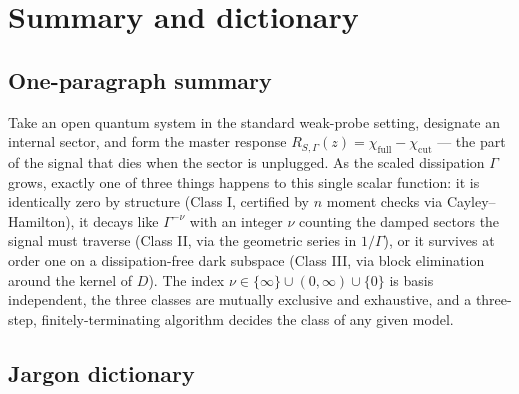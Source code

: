 \documentclass[11pt]{article}
\begin{document}
\section{Summary and dictionary}

\subsection{One-paragraph summary}

Take an open quantum system in the standard weak-probe setting, designate an
internal sector, and form the master response
$R_{S,\Gamma}(z)=\chi_{\mathrm{full}}-\chi_{\mathrm{cut}}$ --- the part of
the signal that dies when the sector is unplugged.  As the scaled dissipation
$\Gamma$ grows, exactly one of three things happens to this single scalar
function: it is identically zero by structure (Class I, certified by $n$
moment checks via Cayley--Hamilton), it decays like $\Gamma^{-\nu}$ with an
integer $\nu$ counting the damped sectors the signal must traverse
(Class II, via the geometric series in $1/\Gamma$), or it survives at order
one on a dissipation-free dark subspace (Class III, via block elimination
around the kernel of $D$).  The index $\nu\in\{\infty\}\cup(0,\infty)\cup\{0\}$
is basis independent, the three classes are mutually exclusive and
exhaustive, and a three-step, finitely-terminating algorithm decides the
class of any given model.

\subsection{Jargon dictionary}
\end{document}
